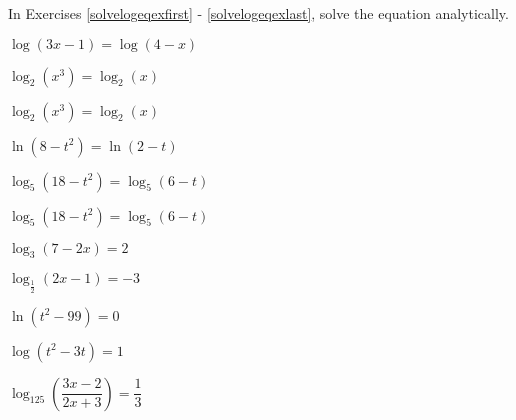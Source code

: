 \documentclass{ximera}
\begin{document}
	\author{Stitz-Zeager}



\label{ExercisesforLogarithmicEquationsandInequalities}

\begin{question}

In Exercises \ref{solvelogeqexfirst} - \ref{solvelogeqexlast}, solve the equation analytically.

\begin{problem}\label{solvelogeqexfirst}
$\log(3x-1) = \log(4-x)$
\end{problem}

\begin{problem}
$\log_{2}\left(x^{3}\right) = \log_{2}(x)$
\end{problem}

\begin{problem}
$\log_{2}\left(x^{3}\right) = \log_{2}(x)$
\end{problem}

\begin{problem}
$\ln\left(8-t^2\right)=\ln(2-t)$ 
\end{problem}

\begin{problem}
$\log_{5}\left(18-t^2\right) = \log_{5}(6-t)$
\end{problem}

\begin{problem}
$\log_{5}\left(18-t^2\right) = \log_{5}(6-t)$
\end{problem}

\begin{problem}
$\log_{3}(7-2x) = 2$
\end{problem}

\begin{problem}
$\log_{\frac{1}{2}} (2x-1) = -3$
\end{problem}

\begin{problem}
$\ln\left(t^2-99\right) = 0$
\end{problem}

\begin{problem}
$\log(t^2-3t) = 1$
\end{problem}

\begin{problem}
$\log_{125} \left(\dfrac{3x-2}{2x+3}\right)=\dfrac{1}{3}$
\end{problem}

\end{question}
\end{document}
